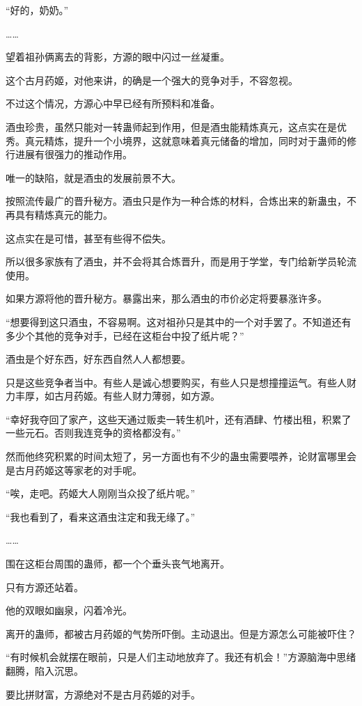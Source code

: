 \begin{this_body}
“好的，奶奶。”

……

望着祖孙俩离去的背影，方源的眼中闪过一丝凝重。

这个古月药姬，对他来讲，的确是一个强大的竞争对手，不容忽视。

不过这个情况，方源心中早已经有所预料和准备。

酒虫珍贵，虽然只能对一转蛊师起到作用，但是酒虫能精炼真元，这点实在是优秀。真元精炼，提升一个小境界，这就意味着真元储备的增加，同时对于蛊师的修行进展有很强力的推动作用。

唯一的缺陷，就是酒虫的发展前景不大。

按照流传最广的晋升秘方。酒虫只是作为一种合炼的材料，合炼出来的新蛊虫，不再具有精炼真元的能力。

这点实在是可惜，甚至有些得不偿失。

所以很多家族有了酒虫，并不会将其合炼晋升，而是用于学堂，专门给新学员轮流使用。

如果方源将他的晋升秘方。暴露出来，那么酒虫的市价必定将要暴涨许多。

“想要得到这只酒虫，不容易啊。这对祖孙只是其中的一个对手罢了。不知道还有多少个其他的竞争对手，已经在这柜台中投了纸片呢？”

酒虫是个好东西，好东西自然人人都想要。

只是这些竞争者当中。有些人是诚心想要购买，有些人只是想撞撞运气。有些人财力丰厚，如古月药姬。有些人财力薄弱，如方源。

“幸好我夺回了家产，这些天通过贩卖一转生机叶，还有酒肆、竹楼出租，积累了一些元石。否则我连竞争的资格都没有。”

然而他终究积累的时间太短了，另一方面也有不少的蛊虫需要喂养，论财富哪里会是古月药姬这等家老的对手呢。

“唉，走吧。药姬大人刚刚当众投了纸片呢。”

“我也看到了，看来这酒虫注定和我无缘了。”

……

围在这柜台周围的蛊师，都一个个垂头丧气地离开。

只有方源还站着。

他的双眼如幽泉，闪着冷光。

离开的蛊师，都被古月药姬的气势所吓倒。主动退出。但是方源怎么可能被吓住？

“有时候机会就摆在眼前，只是人们主动地放弃了。我还有机会！”方源脑海中思绪翻腾，陷入沉思。

要比拼财富，方源绝对不是古月药姬的对手。


\end{this_body}
